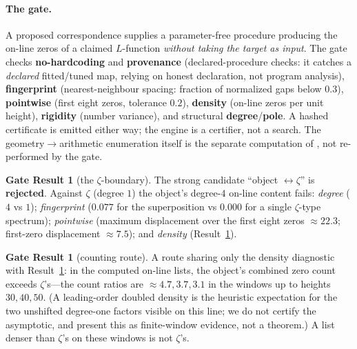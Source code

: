 \documentclass[11pt]{article}
\theoremstyle{definition}
\newtheorem{result}[theorem]{Gate Result}
\begin{document}
\paragraph{The gate.} A proposed correspondence supplies a parameter-free procedure
producing the on-line zeros of a claimed $L$-function \emph{without taking the target as
input}. The gate checks \textbf{no-hardcoding} and \textbf{provenance} (declared-procedure
checks: it catches a \emph{declared} fitted/tuned map, relying on honest declaration,
not program analysis), \textbf{fingerprint} (nearest-neighbour spacing: fraction of
normalized gaps below $0.3$), \textbf{pointwise} (first eight zeros, tolerance $0.2$),
\textbf{density} (on-line zeros per unit height), \textbf{rigidity} (number variance),
and structural \textbf{degree}/\textbf{pole}. A hashed certificate is emitted either way;
the engine is a certifier, not a search. The geometry$\to$arithmetic enumeration itself
is the separate computation of \cite{IcosianTriad}, not re-performed by the gate.

\begin{result}[the $\zeta$-boundary]\label{res:o2}
The strong candidate ``object $\leftrightarrow\zeta$'' is \textbf{rejected}. Against
$\zeta$ (degree $1$) the object's degree-$4$ on-line content fails: \emph{degree}
($4$ vs $1$); \emph{fingerprint} ($0.077$ for the superposition vs $0.000$ for a single
$\zeta$-type spectrum); \emph{pointwise} (maximum displacement over the first eight
zeros $\approx 22.3$; first-zero displacement $\approx 7.5$); and \emph{density}
(Result~\ref{res:o2b}).
\end{result}
\begin{result}[counting route]\label{res:o2b}
A route sharing only the density diagnostic with Result~\ref{res:o2}: in the computed
on-line lists, the object's combined zero count exceeds $\zeta$'s---the count ratios are
$\approx 4.7, 3.7, 3.1$ in the windows up to heights $30,40,50$. (A leading-order
doubled density is the heuristic expectation for the two unshifted degree-one factors
visible on this line; we
do not certify the asymptotic, and present this as finite-window evidence, not a
theorem.) A list denser than $\zeta$'s on these windows is not $\zeta$'s.
\end{result}
\end{document}

